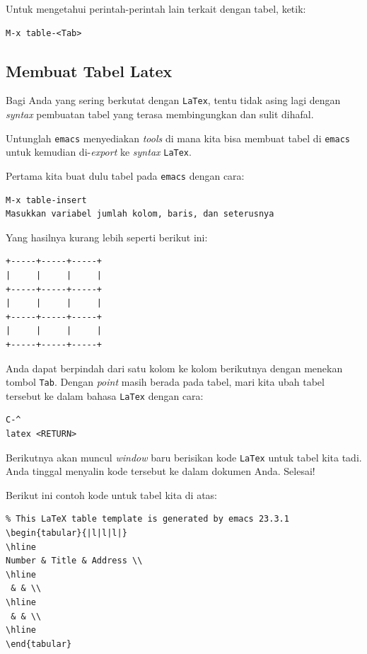 \documentclass{article}
\begin{document}
Untuk mengetahui perintah-perintah lain terkait dengan tabel, ketik:

\begin{verbatim}
M-x table-<Tab>
\end{verbatim}

\subsection{Membuat Tabel Latex}
Bagi Anda yang sering berkutat dengan \verb=LaTex=, tentu tidak asing lagi
dengan \emph{syntax} pembuatan tabel yang terasa membingungkan dan sulit
dihafal.

Untunglah \verb=emacs= menyediakan \emph{tools} di mana kita bisa membuat
tabel di \verb=emacs= untuk kemudian di-\emph{export} ke \emph{syntax}
\verb=LaTex=.

Pertama kita buat dulu tabel pada \verb=emacs= dengan cara:

\begin{verbatim}
M-x table-insert
Masukkan variabel jumlah kolom, baris, dan seterusnya
\end{verbatim}

Yang hasilnya kurang lebih seperti berikut ini:

\begin{verbatim}
+-----+-----+-----+
|     |     |     |
+-----+-----+-----+
|     |     |     |
+-----+-----+-----+
|     |     |     |
+-----+-----+-----+
\end{verbatim}

Anda dapat berpindah dari satu kolom ke kolom berikutnya dengan menekan
tombol \verb=Tab=. Dengan \emph{point} masih berada pada tabel, mari kita ubah 
tabel tersebut ke dalam bahasa \verb=LaTex= dengan cara:

\begin{verbatim}
C-^
latex <RETURN>
\end{verbatim}

Berikutnya akan muncul \emph{window} baru berisikan kode \verb=LaTex= untuk 
tabel kita tadi. Anda tinggal menyalin kode tersebut ke dalam dokumen Anda.
Selesai!

Berikut ini contoh kode untuk tabel kita di atas:

\begin{verbatim}
% This LaTeX table template is generated by emacs 23.3.1
\begin{tabular}{|l|l|l|}
\hline
Number & Title & Address \\
\hline
 & & \\
\hline
 & & \\
\hline
\end{tabular}
\end{verbatim}
\end{document}
